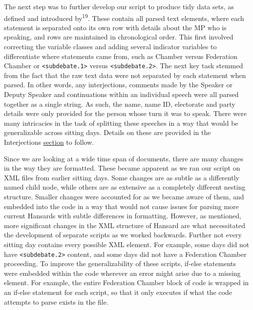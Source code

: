 \documentclass[
  letterpaper,
  DIV=11,
  numbers=noendperiod]{scrartcl}
\begin{document}
The next step was to further develop our script to produce tidy data
sets, as defined and introduced by\textsuperscript{19}. These contain
all parsed text elements, where each statement is separated onto its own
row with details about the MP who is speaking, and rows are maintained
in chronological order. This first involved correcting the variable
classes and adding several indicator variables to differentiate where
statements came from, such as Chamber versus Federation Chamber or
\texttt{\textless{}subdebate.1\textgreater{}} versus
\texttt{\textless{}subdebate.2\textgreater{}}. The next key task stemmed
from the fact that the raw text data were not separated by each
statement when parsed. In other words, any interjections, comments made
by the Speaker or Deputy Speaker and continuations within an individual
speech were all parsed together as a single string. As such, the name,
name ID, electorate and party details were only provided for the person
whose turn it was to speak. There were many intricacies in the task of
splitting these speeches in a way that would be generalizable across
sitting days. Details on these are provided in the Interjections
\protect\hyperlink{sec-interject}{section} to follow.

Since we are looking at a wide time span of documents, there are many
changes in the way they are formatted. These became apparent as we ran
our script on XML files from earlier sitting days. Some changes are as
subtle as a differently named child node, while others are as extensive
as a completely different nesting structure. Smaller changes were
accounted for as we became aware of them, and embedded into the code in
a way that would not cause issues for parsing more current Hansards with
subtle differences in formatting. However, as mentioned, more
significant changes in the XML structure of Hansard are what
necessitated the development of separate scripts as we worked backwards.
Further not every sitting day contains every possible XML element. For
example, some days did not have
\texttt{\textless{}subdebate.2\textgreater{}} content, and some days did
not have a Federation Chamber proceeding. To improve the
generalizability of these scripts, if-else statements were embedded
within the code wherever an error might arise due to a missing element.
For example, the entire Federation Chamber block of code is wrapped in
an if-else statement for each script, so that it only executes if what
the code attempts to parse exists in the file.
\end{document}
